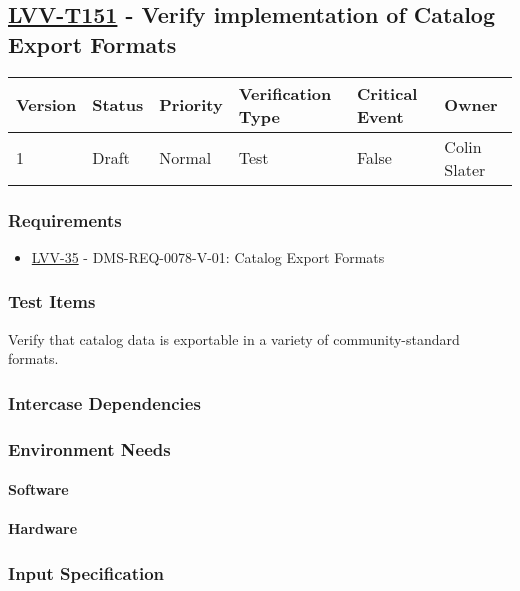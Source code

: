 \subsection{\href{https://jira.lsstcorp.org/secure/Tests.jspa\#/testCase/LVV-T151}{LVV-T151}
    - Verify implementation of Catalog Export Formats}\label{lvv-t151}

\begin{longtable}[]{llllll}
\toprule
Version & Status & Priority & Verification Type & Critical Event & Owner
\\\midrule
1 & Draft & Normal &
Test & False & Colin Slater
\\\bottomrule
\end{longtable}

\subsubsection{Requirements}
\begin{itemize}
\item \href{https://jira.lsstcorp.org/browse/LVV-35}{LVV-35} - DMS-REQ-0078-V-01: Catalog Export Formats
\end{itemize}

\subsubsection{Test Items}
Verify that catalog data is exportable in a variety of
community-standard formats.



\subsubsection{Intercase Dependencies}

\subsubsection{Environment Needs}

\paragraph{Software}

\paragraph{Hardware}

\subsubsection{Input Specification}

